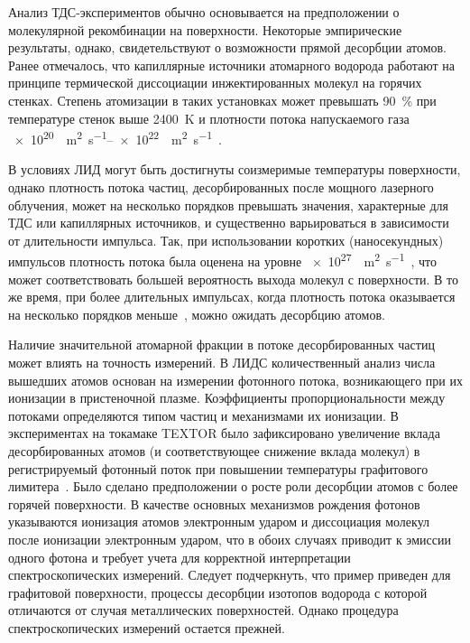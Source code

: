 Анализ ТДС-экспериментов обычно основывается на предположении о молекулярной рекомбинации на поверхности. Некоторые эмпирические результаты, однако, свидетельствуют о возможности прямой десорбции атомов. Ранее отмечалось, что капиллярные источники атомарного водорода работают на принципе термической диссоциации инжектированных молекул на горячих стенках. Степень атомизации в таких установках может превышать \SI{90}{\percent} при температуре стенок выше \SI{2400}{\kelvin} и плотности потока напускаемого газа \SIrange{e20}{e22}{\per\meter\squared\per\second}~\cite{Tschersich2000,Tschersich2008}.

В условиях ЛИД могут быть достигнуты соизмеримые температуры поверхности, однако плотность потока частиц, десорбированных после мощного лазерного облучения, может на несколько порядков превышать значения, характерные для ТДС или капиллярных источников, и существенно варьироваться в зависимости от длительности импульса. Так, при использовании коротких (наносекундных) импульсов плотность потока была оценена на уровне \SI{e27}{\per\meter\squared\per\second}~\cite{Gasparyan2021}, что может соответствовать большей вероятность выхода молекул с поверхности. В то же время, при более длительных импульсах, когда плотность потока оказывается на несколько порядков меньше~\cite{Yu2019}, можно ожидать десорбцию атомов.

Наличие значительной атомарной фракции в потоке десорбированных частиц может влиять на точность измерений. В ЛИДС количественный анализ числа вышедших атомов основан на измерении фотонного потока, возникающего при их ионизации в пристеночной плазме. Коэффициенты пропорциональности между потоками определяются типом частиц и механизмами их ионизации. В экспериментах на токамаке TEXTOR было зафиксировано увеличение вклада десорбированных атомов (и соответствующее снижение вклада молекул) в регистрируемый фотонный поток при повышении температуры графитового лимитера~\cite{Brezinsek2005}. Было сделано предположении о росте роли десорбции атомов с более горячей поверхности. В качестве основных механизмов рождения фотонов указываются ионизация атомов электронным ударом и диссоциация молекул после ионизации электронным ударом, что в обоих случаях приводит к эмиссии одного фотона и требует учета для корректной интерпретации спектроскопических измерений. Следует подчеркнуть, что пример приведен для графитовой поверхности, процессы десорбции изотопов водорода с которой отличаются от случая металлических поверхностей. Однако процедура спектроскопических измерений остается прежней.

